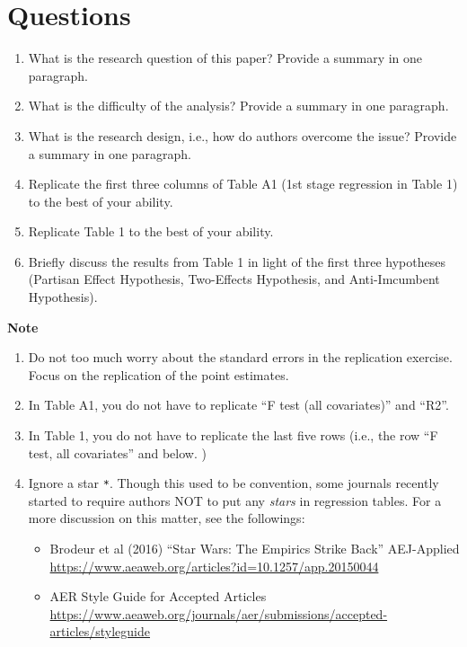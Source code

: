 \documentclass[]{book}
\providecommand{\tightlist}{%
  \setlength{\itemsep}{0pt}\setlength{\parskip}{0pt}}
\begin{document}
\section{Questions}\label{questions-2}

\begin{enumerate}
\def\labelenumi{\arabic{enumi}.}
\tightlist
\item
  What is the research question of this paper? Provide a summary in one
  paragraph.
\item
  What is the difficulty of the analysis? Provide a summary in one
  paragraph.
\item
  What is the research design, i.e., how do authors overcome the issue?
  Provide a summary in one paragraph.
\item
  Replicate the first three columns of Table A1 (1st stage regression in
  Table 1) to the best of your ability.
\item
  Replicate Table 1 to the best of your ability.
\item
  Briefly discuss the results from Table 1 in light of the first three
  hypotheses (Partisan Effect Hypothesis, Two-Effects Hypothesis, and
  Anti-Imcumbent Hypothesis).
\end{enumerate}

\textbf{Note}

\begin{enumerate}
\def\labelenumi{\arabic{enumi}.}
\tightlist
\item
  Do not too much worry about the standard errors in the replication
  exercise. Focus on the replication of the point estimates.
\item
  In Table A1, you do not have to replicate ``F test (all covariates)''
  and ``R2''.\\
\item
  In Table 1, you do not have to replicate the last five rows (i.e., the
  row ``F test, all covariates'' and below. )
\item
  Ignore a star \texttt{*}. Though this used to be convention, some
  journals recently started to require authors NOT to put any
  \emph{stars} in regression tables. For a more discussion on this
  matter, see the followings:

  \begin{itemize}
  \tightlist
  \item
    Brodeur et al (2016) ``Star Wars: The Empirics Strike Back''
    AEJ-Applied
    \url{https://www.aeaweb.org/articles?id=10.1257/app.20150044}
  \item
    AER Style Guide for Accepted Articles
    \url{https://www.aeaweb.org/journals/aer/submissions/accepted-articles/styleguide}
  \end{itemize}
\end{enumerate}
\end{document}
